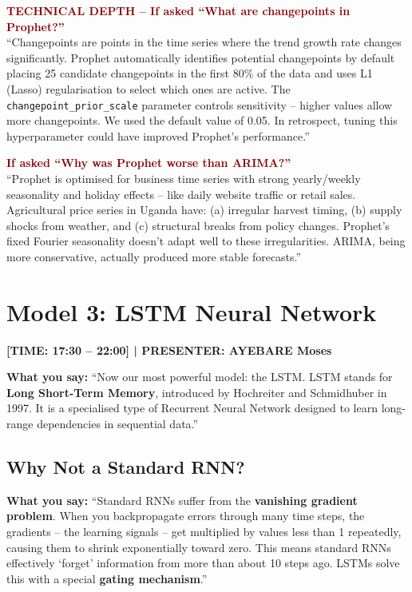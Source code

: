\documentclass[11pt,a4paper]{article}
\begin{document}
\begin{mdframed}[backgroundcolor=red!5, linecolor=darkred]
\textcolor{darkred}{\textbf{TECHNICAL DEPTH -- If asked ``What are changepoints in Prophet?''}}\\
``Changepoints are points in the time series where the trend growth rate changes significantly. Prophet automatically identifies potential changepoints by default placing 25 candidate changepoints in the first 80\% of the data and uses L1 (Lasso) regularisation to select which ones are active. The \texttt{changepoint\_prior\_scale} parameter controls sensitivity -- higher values allow more changepoints. We used the default value of 0.05. In retrospect, tuning this hyperparameter could have improved Prophet's performance.''

\textcolor{darkred}{\textbf{If asked ``Why was Prophet worse than ARIMA?''}}\\
``Prophet is optimised for business time series with strong yearly/weekly seasonality and holiday effects -- like daily website traffic or retail sales. Agricultural price series in Uganda have: (a) irregular harvest timing, (b) supply shocks from weather, and (c) structural breaks from policy changes. Prophet's fixed Fourier seasonality doesn't adapt well to these irregularities. ARIMA, being more conservative, actually produced more stable forecasts.''
\end{mdframed}

\section{Model 3: LSTM Neural Network}
\textcolor{timecolor}{\textbf{[TIME: 17:30 -- 22:00] | PRESENTER: AYEBARE Moses}}

\textbf{What you say:}
``Now our most powerful model: the LSTM. LSTM stands for \textbf{Long Short-Term Memory}, introduced by Hochreiter and Schmidhuber in 1997. It is a specialised type of Recurrent Neural Network designed to learn long-range dependencies in sequential data.''

\subsection{Why Not a Standard RNN?}
\textbf{What you say:}
``Standard RNNs suffer from the \textbf{vanishing gradient problem}. When you backpropagate errors through many time steps, the gradients -- the learning signals -- get multiplied by values less than 1 repeatedly, causing them to shrink exponentially toward zero. This means standard RNNs effectively `forget' information from more than about 10 steps ago. LSTMs solve this with a special \textbf{gating mechanism}.''
\end{document}
